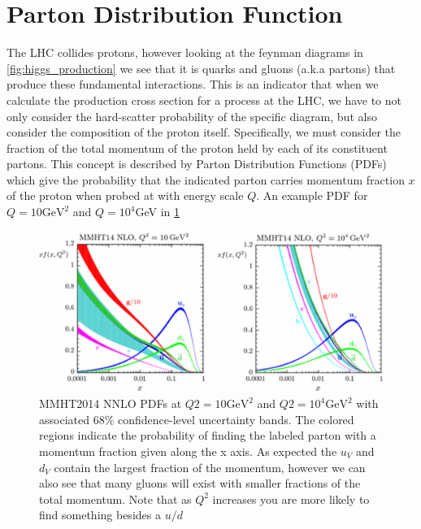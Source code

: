 \section{Parton Distribution Function} \label{sec:higgs:partons}

The LHC collides protons, however looking at the feynman diagrams in
\cref{fig:higgs_production} we see that it is quarks and gluons (a.k.a partons)
that produce these fundamental interactions. This is an indicator that when we
calculate the production cross section for a process at the LHC, we have to not
only consider the hard-scatter probability of the specific diagram, but also
consider the composition of the proton itself.  Specifically, we must consider
the fraction of the total momentum of the proton held by each of its constituent
partons.  This concept is described by Parton Distribution Functions (PDFs)
which give the probability that the indicated parton carries momentum fraction
$x$ of the proton when probed at with energy scale $Q$.  An example PDF for $Q =
10\text{GeV}^2$ and $Q = 10^{4}$GeV in \cref{fig:parton_distribution_function}

\begin{figure}[!htbp]
  \begin{center}
    \includegraphics[width=0.8\linewidth]{figures/higgs/pdf.pdf}
    \caption{ \cite{Harland-Lang2015} MMHT2014 NNLO PDFs at $Q2 = 10\text{GeV}^{2}$ and $Q2
=10^{4}\text{GeV}^{2}$ with associated 68\% confidence-level uncertainty bands.
The colored regions indicate the probability of finding the labeled parton with
a momentum fraction given along the x axis. As expected the $u_V$ and $d_V$
contain the largest fraction of the momentum, however we can also see that many
gluons will exist with smaller fractions of the total momentum. Note that as
$Q^2$ increases you are more likely to find something besides a $u/d$}
    \label{fig:parton_distribution_function}
  \end{center}
\end{figure}
